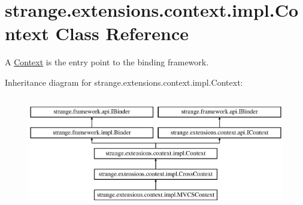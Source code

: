 \hypertarget{classstrange_1_1extensions_1_1context_1_1impl_1_1_context}{\section{strange.\-extensions.\-context.\-impl.\-Context Class Reference}
\label{classstrange_1_1extensions_1_1context_1_1impl_1_1_context}
}


A \hyperlink{classstrange_1_1extensions_1_1context_1_1impl_1_1_context}{Context} is the entry point to the binding framework.  


Inheritance diagram for strange.\-extensions.\-context.\-impl.\-Context\-:\begin{figure}[H]
\begin{center}
\leavevmode
\includegraphics[height=5.000000cm]{classstrange_1_1extensions_1_1context_1_1impl_1_1_context}
\end{center}
\end{figure}
